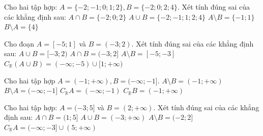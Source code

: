 \begin{ex}%
	Cho hai tập  hợp: $A=\{-2;-1; 0; 1; 2\}, B=\{-2; 0; 2; 4\}$. Xét tính đúng sai của các khẳng định sau:
	 \choiceTF
		{\True  $A\cap B=\{-2; 0; 2\}$}
		 {$A\cup B=\{-2;-1; 1; 2; 4\}$}
		{\True $A\setminus B=\{-1; 1\}$} 
		 {\True $B\setminus A=\{4\}$}
\end{ex}

\begin{ex}%
	Cho đoạn $A=[-5; 1]$ và $B=(-3; 2)$.  Xét tính đúng sai của các khẳng định sau:
	\choiceTF 
		 {$A\cup B=[-3; 2)$}
		{$A\cap B=(-3;  2]$}
		 {\True $A\setminus B=[-5;-3]$}
		 {$C_{\mathbb{R}}(A\cup B)=(-\infty;-5) \cup[1;+\infty)$}
	 \loigiai{
		\begin{itemchoice}
			\itemch $A\cup B=[-5; 2)$. 
			\itemch $A\cap B=(-3; 1]$. 
			 \itemch $A\setminus B=[-5;-3]$.
			\itemch $C_{\mathbb{R}}(A\cup B)=(-\infty;-5)  \cup[2;+\infty)$..
		\end{itemchoice}
	 }
\end{ex}

\begin{ex}%
	Cho  hai tập hợp $A=(-1;+\infty), B=(-\infty;-1]$.
	\choiceTF 
		{\True  $A\setminus B=(-1;+\infty)$}
		 {\True $B\setminus A=(-\infty;-1]$}
		{$C_{\mathbb{R}} A=(-\infty;-1)$} 
		 {\True $C_{\mathbb{R}} B=(-1;+\infty)$}
	\loigiai{ 
		\begin{itemchoice}
			\itemch $A\setminus  B=(-1;+\infty)$.
			\itemch $B\setminus A=(-\infty;-1]$. 
			\itemch  $C_{\mathbb{R}} A=(-\infty;-1]$.
			\itemch  $C_{\mathbb{R}} B=(-1;+\infty)$.
		\end{itemchoice}
	 }
\end{ex}

\begin{ex}%
	Cho hai tập hợp: $A=(-3; 5]$ và $B=(2;+\infty)$.  Xét tính đúng sai của các khẳng định sau:
	 \choiceTF
		 {$A\cap B=(1; 5]$}
		{\True $A\cup  B=(-3;+\infty)$}
		{$A\setminus B=(-2; 2]$} 
		 {\True $C_{\mathbb{R}} A=(-\infty;-3] \cup(5;+\infty)$}
	\loigiai{ 
		\begin{itemchoice}
			\itemch  $A\cap B=(2; 5]$.
			\itemch $A\cup B=(-3;+\infty)$. 
			\itemch  $A\setminus B=(-3; 2]$.
			 \itemch $C_{\mathbb{R}} A=(-\infty;-3] \cup(5;+\infty)$.
		\end{itemchoice}
	 }
\end{ex}


